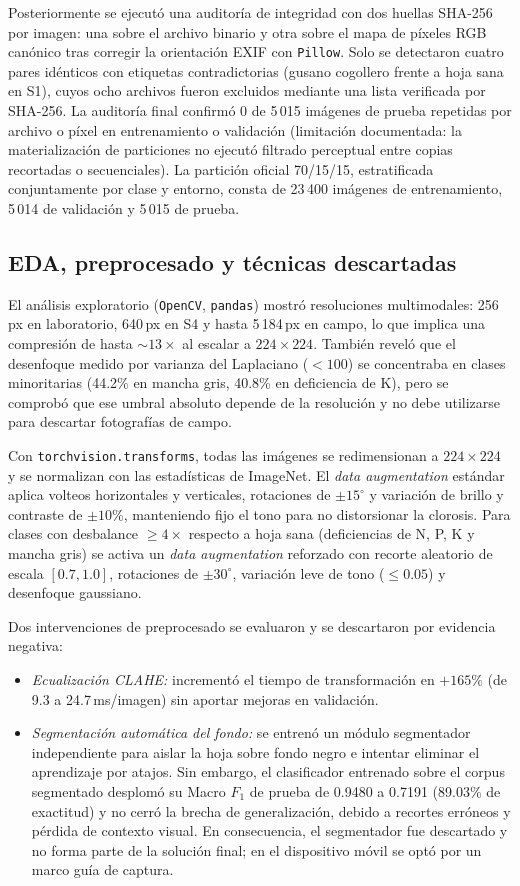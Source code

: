 \documentclass[conference,letterpaper]{IEEEtran}
\newcommand{\Fone}{$F_1$}
\begin{document}
Posteriormente se ejecutó una auditoría de integridad con dos huellas SHA-256 por imagen: una sobre el archivo binario y otra sobre el mapa de píxeles RGB canónico tras corregir la orientación EXIF con \texttt{Pillow}. Solo se detectaron cuatro pares idénticos con etiquetas contradictorias (gusano cogollero frente a hoja sana en S1), cuyos ocho archivos fueron excluidos mediante una lista verificada por SHA-256. La auditoría final confirmó 0 de 5\,015 imágenes de prueba repetidas por archivo o píxel en entrenamiento o validación (limitación documentada: la materialización de particiones no ejecutó filtrado perceptual entre copias recortadas o secuenciales). La partición oficial 70/15/15, estratificada conjuntamente por clase y entorno, consta de 23\,400 imágenes de entrenamiento, 5\,014 de validación y 5\,015 de prueba.

\subsection{EDA, preprocesado y técnicas descartadas}
El análisis exploratorio (\texttt{OpenCV}, \texttt{pandas}) mostró resoluciones multimodales: 256\,px en laboratorio, 640\,px en S4 y hasta 5\,184\,px en campo, lo que implica una compresión de hasta ${\sim}13\times$ al escalar a $224\times224$. También reveló que el desenfoque medido por varianza del Laplaciano ($<100$) se concentraba en clases minoritarias (44.2\% en mancha gris, 40.8\% en deficiencia de K), pero se comprobó que ese umbral absoluto depende de la resolución y no debe utilizarse para descartar fotografías de campo.

Con \texttt{torchvision.transforms}, todas las imágenes se redimensionan a $224\times224$ y se normalizan con las estadísticas de ImageNet. El \textit{data augmentation} estándar aplica volteos horizontales y verticales, rotaciones de $\pm15^\circ$ y variación de brillo y contraste de $\pm10\%$, manteniendo fijo el tono para no distorsionar la clorosis. Para clases con desbalance $\ge 4\times$ respecto a hoja sana (deficiencias de N, P, K y mancha gris) se activa un \textit{data augmentation} reforzado con recorte aleatorio de escala $[0.7,1.0]$, rotaciones de $\pm30^\circ$, variación leve de tono ($\le0.05$) y desenfoque gaussiano.

Dos intervenciones de preprocesado se evaluaron y se descartaron por evidencia negativa:
\begin{itemize}
\item \textit{Ecualización CLAHE:} incrementó el tiempo de transformación en $+165\%$ (de 9.3 a 24.7\,ms/imagen) sin aportar mejoras en validación.
\item \textit{Segmentación automática del fondo:} se entrenó un módulo segmentador independiente para aislar la hoja sobre fondo negro e intentar eliminar el aprendizaje por atajos. Sin embargo, el clasificador entrenado sobre el corpus segmentado desplomó su Macro \Fone{} de prueba de 0.9480 a 0.7191 (89.03\% de exactitud) y no cerró la brecha de generalización, debido a recortes erróneos y pérdida de contexto visual. En consecuencia, el segmentador fue descartado y no forma parte de la solución final; en el dispositivo móvil se optó por un marco guía de captura.
\end{itemize}
\end{document}
